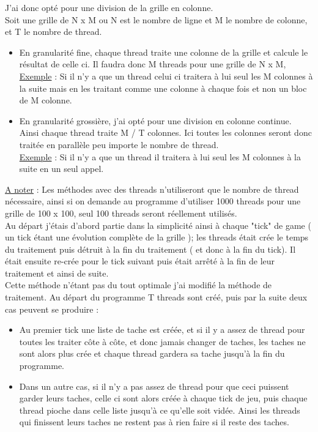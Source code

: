 \documentclass[10pt,a4paper]{article}
\begin{document}
J'ai donc opté pour une division de la grille en colonne. \\

Soit une grille de N x M ou N est le nombre de ligne et M le nombre de colonne, et T le nombre de thread.
\begin{itemize}
    \item En granularité fine, chaque thread traite une colonne de la grille et calcule le résultat de celle ci. Il faudra donc M threads pour une grille de N x M,  \\
    \underline{Exemple} : Si il n'y a que un thread celui ci traitera à lui seul les M colonnes à la suite mais en les traitant comme une colonne à chaque fois et non un bloc de M colonne.\\
    
    \item En granularité grossière, j'ai opté pour une division en colonne continue. \\
    Ainsi chaque thread traite M / T colonnes. Ici toutes les colonnes seront donc traitée en parallèle peu importe le nombre de thread. \\
    \underline{Exemple} : Si il n'y a que un thread il traitera à lui seul les M colonnes à la suite en un seul appel.
\end{itemize}
\hfill\break
\underline{A noter} : Les méthodes avec des threads n'utiliseront que le nombre de thread nécessaire, ainsi si on demande au programme d'utiliser 1000 threads pour une grille de 100 x 100, seul 100 threads seront réellement utilisés. \\

Au départ j'étais d'abord partie dans la simplicité ainsi à chaque "tick" de game ( un tick étant une évolution complète de la grille ); les threads était crée le temps du traitement puis détruit à la fin du traitement ( et donc à la fin du tick). 
Il était ensuite re-crée pour le tick suivant puis était arrêté à la fin de leur traitement et ainsi de suite. \\

Cette méthode n'étant pas du tout optimale j'ai modifié la méthode de traitement. Au départ du programme T threads sont créé, puis par la suite deux cas peuvent se produire :
\begin{itemize}
    \item Au premier tick une liste de tache est créée, et si il y a assez de thread pour toutes les traiter côte à côte, et donc jamais changer de taches, les taches ne sont alors plus crée et chaque thread gardera sa tache jusqu'à la fin du programme.
    \item Dans un autre cas, si il n'y a pas assez de thread pour que ceci puissent garder leurs taches, celle ci sont alors créée à chaque tick de jeu, puis chaque thread pioche dans celle liste jusqu'à ce qu'elle soit vidée. Ainsi les threads qui finissent leurs taches ne restent pas à rien faire si il reste des taches.
\end{itemize}
\end{document}
